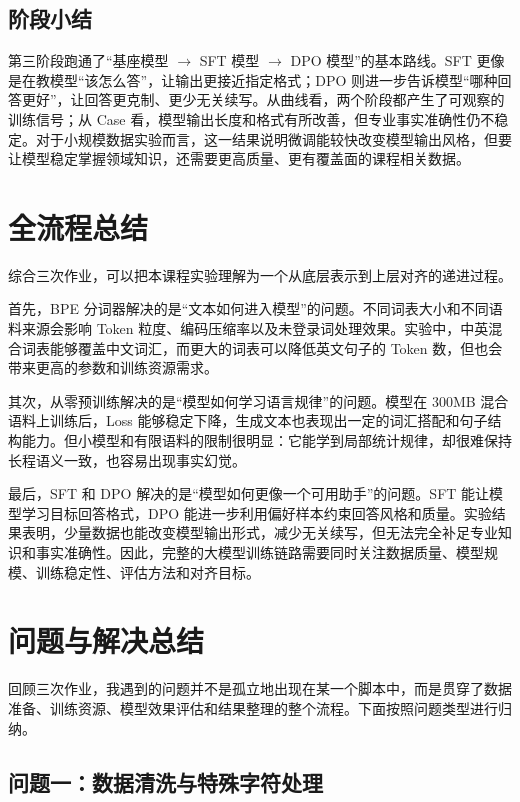 \documentclass[a4paper,12pt]{ctexart}
\begin{document}
\subsection{阶段小结}

第三阶段跑通了“基座模型 $\rightarrow$ SFT 模型 $\rightarrow$ DPO 模型”的基本路线。SFT 更像是在教模型“该怎么答”，让输出更接近指定格式；DPO 则进一步告诉模型“哪种回答更好”，让回答更克制、更少无关续写。从曲线看，两个阶段都产生了可观察的训练信号；从 Case 看，模型输出长度和格式有所改善，但专业事实准确性仍不稳定。对于小规模数据实验而言，这一结果说明微调能较快改变模型输出风格，但要让模型稳定掌握领域知识，还需要更高质量、更有覆盖面的课程相关数据。

\section{全流程总结}

综合三次作业，可以把本课程实验理解为一个从底层表示到上层对齐的递进过程。

首先，BPE 分词器解决的是“文本如何进入模型”的问题。不同词表大小和不同语料来源会影响 Token 粒度、编码压缩率以及未登录词处理效果。实验中，中英混合词表能够覆盖中文词汇，而更大的词表可以降低英文句子的 Token 数，但也会带来更高的参数和训练资源需求。

其次，从零预训练解决的是“模型如何学习语言规律”的问题。模型在 300MB 混合语料上训练后，Loss 能够稳定下降，生成文本也表现出一定的词汇搭配和句子结构能力。但小模型和有限语料的限制很明显：它能学到局部统计规律，却很难保持长程语义一致，也容易出现事实幻觉。

最后，SFT 和 DPO 解决的是“模型如何更像一个可用助手”的问题。SFT 能让模型学习目标回答格式，DPO 能进一步利用偏好样本约束回答风格和质量。实验结果表明，少量数据也能改变模型输出形式，减少无关续写，但无法完全补足专业知识和事实准确性。因此，完整的大模型训练链路需要同时关注数据质量、模型规模、训练稳定性、评估方法和对齐目标。

\section{问题与解决总结}

回顾三次作业，我遇到的问题并不是孤立地出现在某一个脚本中，而是贯穿了数据准备、训练资源、模型效果评估和结果整理的整个流程。下面按照问题类型进行归纳。

\subsection{问题一：数据清洗与特殊字符处理}
\end{document}
